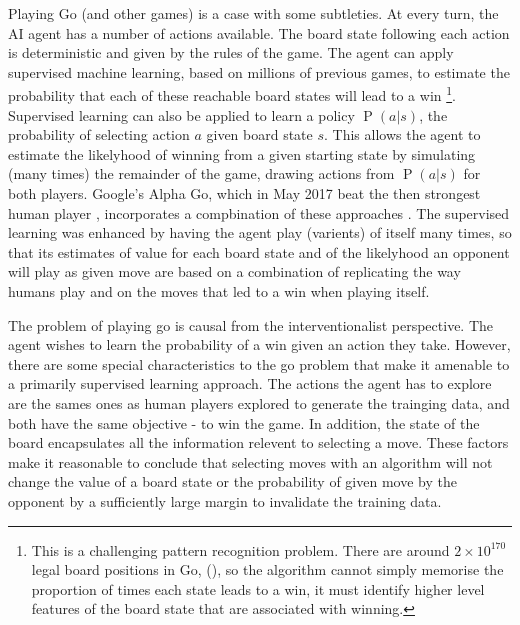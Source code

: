 \documentclass[11pt,a4paper,oneside]{book}
\renewcommand{\P}[1]{\operatorname{P}\left(#1\right)}
\theoremstyle{plain}
\theoremstyle{definition}
\begin{document}
Playing Go (and other games) is a case with some subtleties. At every turn, the AI agent has a number of actions available. The board state following each action is deterministic and given by the rules of the game. The agent can apply supervised machine learning, based on millions of previous games, to estimate the probability that each of these reachable board states will lead to a win \footnote{This is a challenging pattern recognition problem. There are around $2 \times 10^{170}$ legal board positions in Go, (\citep{tromp2016number}), so the algorithm cannot simply memorise the proportion of times each state leads to a win, it must identify higher level features of the board state that are associated with winning.}. Supervised learning can also be applied to learn a policy $\P{a|s}$, the probability of selecting action $a$ given board state $s$. This allows the agent to estimate the likelyhood of winning from a given starting state by simulating (many times) the remainder of the game, drawing actions from $\P{a|s}$ for both players. Google's Alpha Go, which in May 2017 beat the then strongest human player \citep{Mozur2017}, incorporates a compbination of these approaches \citep{silver2016mastering}. The supervised learning was enhanced by having the agent play (varients) of itself many times, so that its estimates of value for each board state and of the likelyhood an opponent will play as given move are based on a combination of replicating the way humans play and on the moves that led to a win when playing itself. 

The problem of playing go is causal from the interventionalist perspective. The agent wishes to learn the probability of a win given an action they take. However, there are some special characteristics to the go problem that make it amenable to a primarily supervised learning approach. The actions the agent has to explore are the sames ones as human players explored to generate the trainging data, and both have the same objective - to win the game. In addition, the state of the board encapsulates all the information relevent to selecting a move. These factors make it reasonable to conclude that selecting moves with an algorithm will not change the value of a board state or the probability of given move by the opponent by a sufficiently large margin to invalidate the training data. 
 
\end{document}
